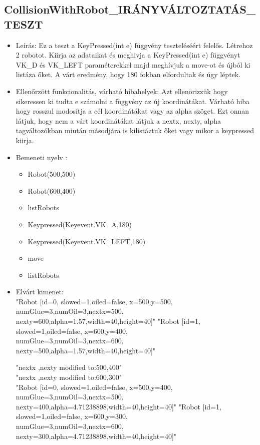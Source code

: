 \subsection{CollisionWithRobot\_IRÁNYVÁLTOZTATÁS\_TESZT}
\begin{itemize}
	\item Leírás: Ez a teszt a KeyPressed(int e) függvény teszteléséért felelős.
			Létrehoz 2 robotot.
			Kiirja az adataikat  és meghivja a KeyPressed(int e)  függvényt VK\_D és VK\_LEFT paraméterekkel majd meghívjuk a move-ot és újból ki listáza őket. A várt eredmény, hogy 180 fokban elfordultak és úgy léptek.			\newline
	\item Ellenőrzött funkcionalitás, várható hibahelyek: Azt ellenörizzük hogy sikeressen ki tudta e számolni a függvény az új koordinátákat.
		Várható hiba hogy rosszul modosítja a cél koordinátákat vagy az alpha szöget. 
		Ezt onnan látjuk, hogy nem a várt koordinátákat látjuk a nextx, nexty, alpha tagváltozókban miután másodjára is kilistáztuk őket vagy mikor a keypressed kiirja.
	\item Bemeneti nyelv :
		\begin{itemize}
		\item Robot(500,500)
		\item Robot(600,400)
		\item listRobots
		\item Keypressed(Keyevent.VK\_A,180)
		\item Keypressed(Keyevent.VK\_LEFT,180)
		\item move
		\item listRobots
		\end{itemize}
	
	\item Elvárt kimenet: \\
		"Robot [id=0,  slowed=1,oiled=false, x=500,y=500, 
		\\numGlue=3,numOil=3,nextx=500,
		\\nexty=600,alpha=1.57,width=40,height=40]"\newline
		"Robot [id=1,  slowed=1,oiled=false, x=600,y=400, 
		\\numGlue=3,numOil=3,nextx=600,
		\\nexty=500,alpha=1.57,width=40,height=40]"\newline
		
		"nextx ,nexty modified to:500,400"\\
		"nextx ,nexty modified to:600,300"\\

		"Robot [id=0,  slowed=1,oiled=false, x=500,y=400, 
		\\numGlue=3,numOil=3,nextx=500,
		\\nexty=400,alpha=4.71238898,width=40,height=40]"\newline
		"Robot [id=1,  slowed=1,oiled=false, x=600,y=300, 
		\\numGlue=3,numOil=3,nextx=600,
		\\nexty=300,alpha=4.71238898,width=40,height=40]"\newline
\end{itemize}

